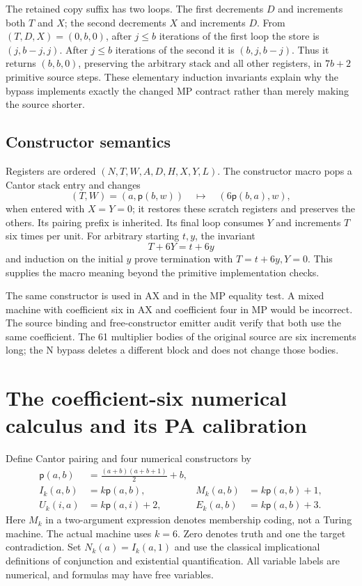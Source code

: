 \documentclass[10pt,letterpaper]{article}
\newcommand{\pair}{\mathsf p}
\begin{document}
The retained copy suffix has two loops. The first decrements $D$ and
increments both $T$ and $X$; the second decrements $X$ and increments $D$.
From $(T,D,X)=(0,b,0)$, after $j\le b$ iterations of the first loop the
store is $(j,b-j,j)$. After $j\le b$ iterations of the second it is
$(b,j,b-j)$. Thus it returns $(b,b,0)$, preserving the arbitrary stack and
all other registers, in $7b+2$ primitive source steps. These elementary
induction invariants explain why the bypass implements exactly the changed
MP contract rather than merely making the source shorter.

\subsection{Constructor semantics}

Registers are ordered $(N,T,W,A,D,H,X,Y,L)$. The constructor macro pops
a Cantor stack entry and changes
\[
 (T,W)=(a,\pair(b,w))\quad\longmapsto\quad(6\pair(b,a),w),
\]
when entered with $X=Y=0$; it restores these scratch registers and
preserves the others. Its pairing prefix is inherited. Its final loop
consumes $Y$ and increments $T$ six times per unit. For arbitrary starting
$t,y$, the invariant
\[
                    T+6Y=t+6y
\]
and induction on the initial $y$ prove termination with $T=t+6y,Y=0$.
This supplies the macro meaning beyond the primitive implementation checks.

The same constructor is used in AX and in the MP equality test. A mixed
machine with coefficient six in AX and coefficient four in MP would be
incorrect. The source binding and free-constructor emitter audit verify
that both use the same coefficient. The 61 multiplier bodies of the
original source are six increments long; the N bypass deletes a different
block and does not change those bodies.

\section{The coefficient-six numerical calculus and its PA calibration}
\label{sec:calculus}

Define Cantor pairing and four numerical constructors by
\begin{align*}
 \pair(a,b)&=\frac{(a+b)(a+b+1)}2+b,\\
 I_k(a,b)&=k\pair(a,b),& M_k(a,b)&=k\pair(a,b)+1,\\
 U_k(i,a)&=k\pair(a,i)+2,& E_k(a,b)&=k\pair(a,b)+3.
\end{align*}
Here $M_k$ in a two-argument expression denotes membership coding, not a
Turing machine. The actual machine uses $k=6$. Zero denotes truth and one
the target contradiction. Set $N_k(a)=I_k(a,1)$ and use the classical
implicational definitions of conjunction and existential quantification.
All variable labels are numerical, and formulas may have free variables.
\end{document}
